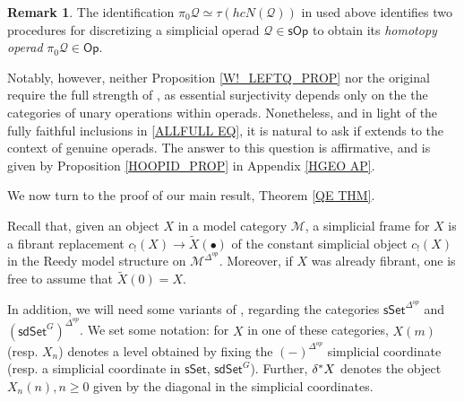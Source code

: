 \documentclass[a4paper,10pt
,draft
]{article}%
\numberwithin{equation}{section}
\numberwithin{figure}{section}
\theoremstyle{definition} %
\newtheorem{remark}[equation]{Remark}%
\newcommand{\vect}[1]{\text{\overrightharp{\ensuremath{#1}}}}
\newcommand{\1}{\ensuremath{\mathbbm 1}}%
\begin{document}
\begin{remark}\label{TWOHOMOP REM}
	The identification
	$\pi_0 \mathcal{Q} \simeq 
	\tau \left(h c N (\mathcal{Q}) \right)$ 
	in \cite[Prop. 4.8]{CM13b}
	used above
	identifies two procedures for discretizing 
	a simplicial operad $\mathcal{Q} \in \mathsf{sOp}$
	to obtain its \emph{homotopy operad}
	$\pi_0 \mathcal{Q} \in \mathsf{Op}$.

	Notably, however, neither 
	Proposition \ref{W!_LEFTQ_PROP}
	nor the original 
	\cite[Prop. 4.9]{CM13b}
	require the full strength
	of \cite[Prop. 4.8]{CM13b}, 
	as essential surjectivity depends only on the 
	the categories of unary operations within operads.
	Nonetheless, and in light of the fully faithful inclusions in 
	\eqref{ALLFULL EQ},
	it is natural to ask
	if \cite[Prop. 4.8]{CM13b}
	extends to the context of genuine operads.
	The answer to this question is affirmative,
	and is given by Proposition \ref{HOOPID_PROP}
	in Appendix \ref{HGEO AP}.
%	
%	
\end{remark}



We now turn to the proof of our main result,
Theorem \ref{QE THM}.


Recall that, given an object $X$ in a model category $\mathcal{M}$,
a simplicial frame for $X$ is a fibrant replacement
$c_!(X) \to \widetilde{X}(\bullet)$ of the constant 
simplicial object $c_!(X)$ in the Reedy model structure on $\mathcal{M}^{\Delta^{op}}$.
Moreover, if $X$ was already fibrant,
one is free to assume that $\widetilde{X}(0) = X$.

In addition, we will need some variants
of \cite[Prop. 4.5]{BP_edss},
regarding the categories
$\mathsf{sSet}^{\Delta^{op}}$
and 
$(\mathsf{sdSet}^G)^{\Delta^{op}}$.
We set some notation: for $X$ in one of these categories,
$X(m)$ (resp. $X_n$) denotes a level obtained by fixing the 
$(-)^{\Delta^{op}}$ simplicial coordinate
(resp. a simplicial coordinate in 
$\mathsf{sSet}$, $\mathsf{sdSet}^G$).
Further, $\delta^{\**}X$
denotes the object $X_n(n),n\geq 0$
given by the diagonal in the simplicial coordinates.
\end{document}
